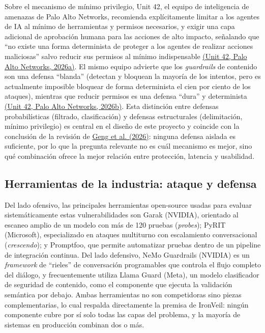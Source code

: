 \documentclass[11pt,letterpaper]{article}
\newcommand{\citeapa}[2]{\hyperlink{#1}{#2}}
\begin{document}
Sobre el mecanismo de mínimo privilegio, Unit 42, el equipo de inteligencia de amenazas de Palo Alto Networks, recomienda explícitamente limitar a los agentes de IA al mínimo de herramientas y permisos necesarios, y exigir una capa adicional de aprobación humana para las acciones de alto impacto, señalando que ``no existe una forma determinista de proteger a los agentes de realizar acciones maliciosas'' salvo reducir sus permisos al mínimo indispensable \citeapa{unit42a2026}{(Unit 42, Palo Alto Networks, 2026a)}. El mismo equipo advierte que los \emph{guardrails} de contenido son una defensa ``blanda'' (detectan y bloquean la mayoría de los intentos, pero es actualmente imposible bloquear de forma determinista el cien por ciento de los ataques), mientras que reducir permisos es una defensa ``dura'' y determinista \citeapa{unit42b2026}{(Unit 42, Palo Alto Networks, 2026b)}. Esta distinción entre defensas probabilísticas (filtrado, clasificación) y defensas estructurales (delimitación, mínimo privilegio) es central en el diseño de este proyecto y coincide con la conclusión de la revisión de \citeapa{geng2026}{Geng et al. (2026)}: ninguna defensa aislada es suficiente, por lo que la pregunta relevante no es cuál mecanismo es mejor, sino qué combinación ofrece la mejor relación entre protección, latencia y usabilidad.

\subsection{Herramientas de la industria: ataque y defensa}

Del lado ofensivo, las principales herramientas open-source usadas para evaluar sistemáticamente estas vulnerabilidades son Garak (NVIDIA), orientado al escaneo amplio de un modelo con más de 120 pruebas (\emph{probes}); PyRIT (Microsoft), especializado en ataques multiturno con escalamiento conversacional (\emph{crescendo}); y Promptfoo, que permite automatizar pruebas dentro de un pipeline de integración continua. Del lado defensivo, NeMo Guardrails (NVIDIA) es un \emph{framework} de ``rieles'' de conversación programables que controla el flujo completo del diálogo, y frecuentemente utiliza Llama Guard (Meta), un modelo clasificador de seguridad de contenido, como el componente que ejecuta la validación semántica por debajo. Ambas herramientas no son competidoras sino piezas complementarias, lo cual respalda directamente la premisa de IronVeil: ningún componente cubre por sí solo todas las capas del problema, y la mayoría de sistemas en producción combinan dos o más.
\end{document}
